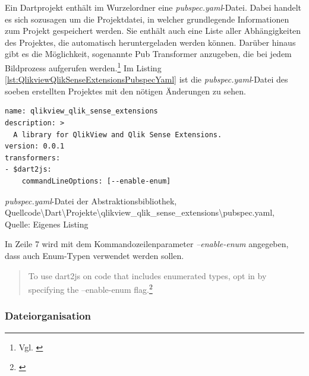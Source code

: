 Ein Dartprojekt enthält im Wurzelordner eine \textit{pubspec.yaml}-Datei. Dabei handelt es sich sozusagen um die Projektdatei, in welcher grundlegende Informationen zum Projekt gespeichert werden. Sie enthält auch eine Liste aller Abhängig\-keiten des Projektes, die automatisch heruntergeladen werden können. Darüber hinaus gibt es die Möglich\-keit, sogenannte Pub Transformer anzugeben, die bei jedem Bildprozess aufgerufen werden.\footnote{Vgl. \cite{PubspecFormat}} Im Listing \ref{lst:QlikviewQlikSenseExtensionsPubspecYaml} ist die \textit{pubspec.yaml}-Datei des soeben erstellten Projektes mit den nötigen Änderungen zu sehen.



\ifIncludeFigures\begin{listing}[htbp]
\begin{verbatim}
name: qlikview_qlik_sense_extensions
description: >
  A library for QlikView and Qlik Sense Extensions.
version: 0.0.1
transformers:
- $dart2js:
    commandLineOptions: [--enable-enum]
\end{verbatim}
\caption[\textit{pubspec.yaml}-Datei der Abstraktionsbibliothek]{\textit{pubspec.yaml}-Datei der Abstraktionsbibliothek, \\Quellcode\textbackslash{}Dart\textbackslash{}Projekte\textbackslash{}qlikview\_qlik\_sense\_extensions\textbackslash{}pubspec.yaml, \\Quelle: Eigenes Listing}
\label{lst:QlikviewQlikSenseExtensionsPubspecYaml}
\end{listing}\fi

In Zeile 7 wird mit dem Kommandozeilenparameter \textit{--enable-enum} angegeben, dass auch Enum-Typen verwendet werden sollen. 
\begin{quote}
To use dart2js on code that includes enumerated types, opt in by specifying the --enable-enum flag.\footnote{\cite{dart2js}}
\end{quote}


\subsubsection{Dateiorganisation}

